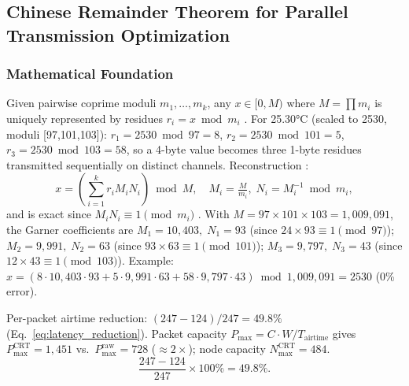 \documentclass[pdflatex,sn-mathphys-num]{sn-jnl}
\theoremstyle{thmstyleone}
\theoremstyle{thmstyletwo}
\theoremstyle{thmstylethree}
\begin{document}
\subsection{Chinese Remainder Theorem for Parallel Transmission Optimization}
\label{subsec:crt_transmission}

\subsubsection{Mathematical Foundation}
\label{subsubsec:parallel_transmission}

Given pairwise coprime moduli $m_1,\ldots,m_k$, any $x \in [0,M)$ where $M=\prod m_i$ is uniquely represented by residues $r_i = x \bmod m_i$ \cite{garner1959residue}. For 25.30°C (scaled to 2530, moduli [97,101,103]): $r_1 = 2530 \bmod 97 = 8$, $r_2 = 2530 \bmod 101 = 5$, $r_3 = 2530 \bmod 103 = 58$, so a 4-byte value becomes three 1-byte residues transmitted sequentially on distinct channels. Reconstruction \cite{knuth1997art}:
\begin{equation}
x = \left(\sum_{i=1}^k r_i M_i N_i\right) \bmod M, \quad M_i=\tfrac{M}{m_i},\; N_i=M_i^{-1}\bmod m_i,
\end{equation}
and is exact since $M_i N_i \equiv 1 \pmod{m_i}$ \cite{hardy2008introduction}. With $M=97\times101\times103=1{,}009{,}091$, the Garner coefficients are $M_1=10{,}403,\;N_1=93$ (since $24\times93\equiv1\pmod{97}$); $M_2=9{,}991,\;N_2=63$ (since $93\times63\equiv1\pmod{101}$); $M_3=9{,}797,\;N_3=43$ (since $12\times43\equiv1\pmod{103}$). Example: $x=(8{\cdot}10{,}403{\cdot}93+5{\cdot}9{,}991{\cdot}63+58{\cdot}9{,}797{\cdot}43)\bmod 1{,}009{,}091=2530$ (0\% error).

Per-packet airtime reduction: $(247-124)/247=49.8\%$ (Eq.~\ref{eq:latency_reduction}). Packet capacity $P_{\max}=C\cdot W/T_{\text{airtime}}$ gives $P_{\max}^{\text{CRT}}=1{,}451$ vs.\ $P_{\max}^{\text{raw}}=728$ ($\approx2\times$); node capacity $N_{\max}^{\text{CRT}}=484$.
\begin{equation}
\frac{247-124}{247}\times100\%=49.8\%.
\label{eq:latency_reduction}
\end{equation}
\end{document}
